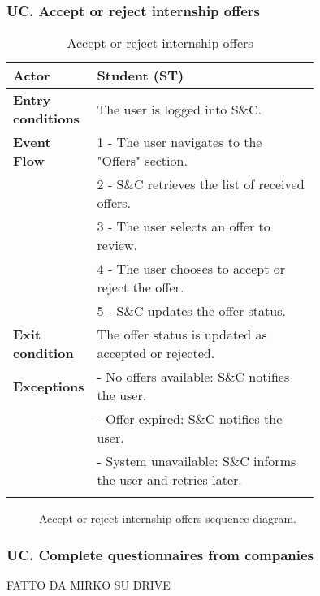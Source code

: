 \subsubsection*{UC\cuc . Accept or reject internship offers}
\begin{center}
    \begin{longtable}{|l|p{0.75\linewidth}|}
        \hline
        \textbf{Actor}            & Student (ST) \\
        \hline
        \textbf{Entry conditions} & The user is logged into S\&C. \\
        \hline
        \textbf{Event Flow}       & 1 - The user navigates to the "Offers" section. \\
        & 2 - S\&C retrieves the list of received offers. \\
        & 3 - The user selects an offer to review. \\
        & 4 - The user chooses to accept or reject the offer. \\
        & 5 - S\&C updates the offer status. \\
        \hline
        \textbf{Exit condition}   & The offer status is updated as accepted or rejected. \\       
        \hline
        \textbf{Exceptions}       & - No offers available: S\&C notifies the user. \\
                                  & - Offer expired: S\&C notifies the user. \\
                                  & - System unavailable: S\&C informs the user and retries later. \\
        \hline
        \caption{Accept or reject internship offers}
        \label{tab:accept_reject_offers_usecase}
    \end{longtable}
\end{center}

\begin{figure}[H]
    \begin{center}
        
        \caption{Accept or reject internship offers sequence diagram.}
        \label{fig:accept_reject_offers_seqd}%
    \end{center}
\end{figure}

\subsubsection*{UC\cuc . Complete questionnaires from companies}
FATTO DA MIRKO SU DRIVE

